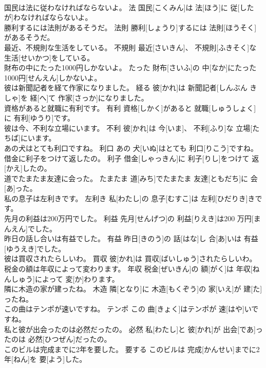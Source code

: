\documentclass[8pt]{extreport}
\begin{document}
\begin{CJK}{UTF8}{min}
\\	国民は法に従わなければならないよ。	法	国民[こくみん]は 法[ほう]に 従[したが]わなければならないよ。	
\\	勝利するには法則があるそうだ。	法則	勝利[しょうり]するには 法則[ほうそく]があるそうだ。	
\\	最近、不規則な生活をしている。	不規則	最近[さいきん]、 不規則[ふきそく]な 生活[せいかつ]をしている。	
\\	財布の中にたった1000円しかないよ。	たった	財布[さいふ]の 中[なか]にたった 1000円[せんえん]しかないよ。	
\\	彼は新聞記者を経て作家になりました。	経る	彼[かれ]は 新聞記者[しんぶん きしゃ]を 経[へ]て 作家[さっか]になりました。	
\\	資格があると就職に有利です。	有利	資格[しかく]があると 就職[しゅうしょく]に 有利[ゆうり]です。	
\\	彼は今、不利な立場にいます。	不利	彼[かれ]は 今[いま]、 不利[ふり]な 立場[たちば]にいます。	
\\	あの犬はとても利口ですね。	利口	あの 犬[いぬ]はとても 利口[りこう]ですね。	
\\	借金に利子をつけて返したの。	利子	借金[しゃっきん]に 利子[りし]をつけて 返[かえ]したの。	
\\	道でたまたま友達に会った。	たまたま	道[みち]でたまたま 友達[ともだち]に 会[あ]った。	
\\	私の息子は左利きです。	左利き	私[わたし]の 息子[むすこ]は 左利[ひだりき]きです。	
\\	先月の利益は200万円でした。	利益	先月[せんげつ]の 利益[りえき]は200 万円[まんえん]でした。	
\\	昨日の話し合いは有益でした。	有益	昨日[きのう]の 話[はな]し 合[あ]いは 有益[ゆうえき]でした。	
\\	彼は買収されたらしいわ。	買収	彼[かれ]は 買収[ばいしゅう]されたらしいわ。	
\\	税金の額は年収によって変わります。	年収	税金[ぜいきん]の 額[がく]は 年収[ねんしゅう]によって 変[か]わります。	
\\	隣に木造の家が建ったね。	木造	隣[となり]に 木造[もくぞう]の 家[いえ]が 建[た]ったね。	
\\	この曲はテンポが速いですね。	テンポ	この 曲[きょく]はテンポが 速[はや]いですね。	
\\	私と彼が出会ったのは必然だったの。	必然	私[わたし]と 彼[かれ]が 出会[であ]ったのは 必然[ひつぜん]だったの。	
\\	このビルは完成までに2年を要した。	要する	このビルは 完成[かんせい]までに2 年[ねん]を 要[よう]した。	

\end{CJK}
\end{document}
